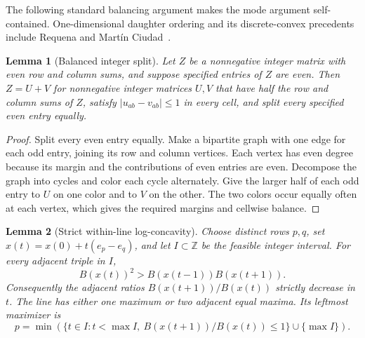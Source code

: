 \documentclass[10pt]{article}
\newtheorem{lemma}{Lemma}
\newcommand{\Z}{\mathbb Z}
\begin{document}
The following standard balancing argument makes the mode argument
self-contained.  One-dimensional daughter ordering and its discrete-convex
precedents include Requena and Mart\'in Ciudad~\cite{requena2006}.

\begin{lemma}[Balanced integer split]
\label{lem:split}
Let \(Z\) be a nonnegative integer matrix with even row and column sums,
and suppose specified entries of \(Z\) are even.  Then
\(Z=U+V\) for nonnegative integer matrices \(U,V\) that have half the
row and column sums of \(Z\), satisfy
\(|u_{ab}-v_{ab}|\le1\) in every cell, and split every specified even
entry equally.
\end{lemma}

\begin{proof}
Split every even entry equally.  Make a bipartite graph with one edge
for each odd entry, joining its row and column vertices.  Each vertex
has even degree because its margin and the contributions of even entries
are even.  Decompose the graph into cycles and color each cycle
alternately.  Give the larger half of each odd entry to \(U\) on one
color and to \(V\) on the other.  The two colors occur equally often at
each vertex, which gives the required margins and cellwise balance.
\end{proof}

\begin{lemma}[Strict within-line log-concavity]
\label{lem:line}
Choose distinct rows \(p,q\), set
\(x(t)=x(0)+t(e_p-e_q)\), and let \(I\subset\Z\) be the feasible
integer interval.  For every adjacent triple in \(I\),
\begin{equation}
  B(x(t))^2>B(x(t-1))B(x(t+1)).
  \label{eq:line-strict}
\end{equation}
Consequently the adjacent ratios \(B(x(t+1))/B(x(t))\) strictly
decrease in \(t\).  The line has either one maximum or two adjacent
equal maxima.  Its leftmost maximizer is
\begin{equation}
 p=\min\left(
 \{t\in I:t<\max I,\ B(x(t+1))/B(x(t))\le1\}
 \cup\{\max I\}\right).
 \label{eq:leftmost-characterization}
\end{equation}
\end{lemma}
\end{document}
